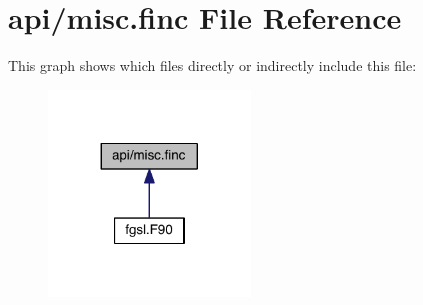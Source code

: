 \hypertarget{misc_8finc}{\section{api/misc.finc File Reference}
\label{misc_8finc}
}
This graph shows which files directly or indirectly include this file\-:
\nopagebreak
\begin{figure}[H]
\begin{center}
\leavevmode
\includegraphics[width=152pt]{misc_8finc__dep__incl}
\end{center}
\end{figure}
